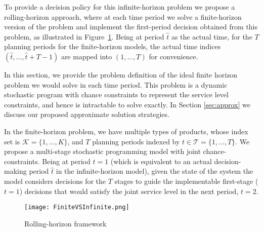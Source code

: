 \documentclass[10pt]{article}
\newcommand{\ti}{t} %
\newcommand{\TI}{\mathcal{T}}
\newcommand{\Ti}{T}
\newcommand{\KA}{\mathcal{K}}
\newcommand{\Ka}{K}
\newcommand{\tAct}{\hat{\ti}} %
\newcommand{\cred}{\color{red!65!black}}
\begin{document}
To provide a decision policy for this infinite-horizon problem we propose a rolling-horizon approach, where at each time period we solve a finite-horizon version of the problem and implement the first-period decision obtained from this problem, as illustrated in Figure~\ref{fig:FiniteVSInfinite}. {\cred Being at period $\tAct$ as the actual time, for the $\Ti$ planning periods for the finite-horizon models, the actual time indices $(\tAct, ..., \tAct +\Ti -1) $ are mapped into $(1, ..., \Ti)$ for convenience.} 

In this section, we provide the problem definition of the ideal finite horizon problem we would solve in each time period. This problem is a dynamic stochastic program with chance constraints to represent the service level constraints, and hence is intractable to solve exactly. In Section \ref{sec:approx} we discuss our proposed approximate solution strategies.

In the finite-horizon problem, we have multiple types of products, whose index set is $\KA= \{1,...,\Ka\}$, and $\Ti$ planning periods indexed by $\ti \in \TI=\{1 , ..., \Ti\}$. We propose a multi-stage stochastic programming model with joint chance-constraints.
Being at period $t=1$  (which is equivalent to an actual decision-making period $\tAct$ in the infinite-horizon model), given the state of the system the model considers decisions for the $\Ti$ stages to guide the implementable first-stage ($\ti =1$) decisions that would satisfy the joint service level in the next period, $\ti=2$.



\begin{figure}[!h]
\begin{center}
\texttt{[image: FiniteVSInfinite.png]}
\caption{Rolling-horizon framework} 
\label{fig:FiniteVSInfinite}
\end{center}
\end{figure}



\end{document}
